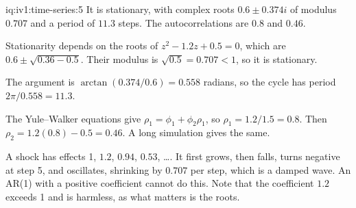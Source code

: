 \begin{solution}{iq:iv1:time-series:5}
It is stationary, with complex roots $0.6 \pm 0.374i$ of modulus $0.707$ and a period of $11.3$ steps. The autocorrelations are $0.8$ and $0.46$.

Stationarity depends on the roots of $z^2 - 1.2z + 0.5 = 0$, which are $0.6 \pm \sqrt{0.36 - 0.5}$. Their modulus is $\sqrt{0.5} = 0.707 < 1$, so it is stationary.

The argument is $\arctan(0.374/0.6) = 0.558$ radians, so the cycle has period $2\pi/0.558 = 11.3$.

The Yule--Walker equations give $\rho_1 = \phi_1 + \phi_2\rho_1$, so $\rho_1 = 1.2/1.5 = 0.8$. Then $\rho_2 = 1.2(0.8) - 0.5 = 0.46$. A long simulation gives the same.

A shock has effects 1, $1.2$, $0.94$, $0.53$, \dots. It first grows, then falls, turns negative at step 5, and oscillates, shrinking by $0.707$ per step, which is a damped wave. An AR(1) with a positive coefficient cannot do this. Note that the coefficient $1.2$ exceeds 1 and is harmless, as what matters is the roots.



\end{solution}

